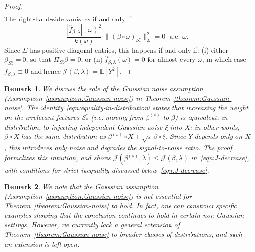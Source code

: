 \documentclass[sn-mathphys-num]{sn-jnl}%
\numberwithin{equation}{section}
\newcommand{\redblock}[1]{{\color{black}#1}}
\theoremstyle{thmstyleone}%
\theoremstyle{thmstyletwo}%
\newtheorem{remark}{Remark}%
\theoremstyle{thmstylethree}%
\begin{document}
\begin{proof}
\begin{equation*}
\begin{split}
\end{split} 
\end{equation*} 
The right-hand-side vanishes if and only if
\begin{equation*}
	\frac{|\widehat {f}_{\beta, \lambda} |(\omega)^2}{k(\omega)} \cdot  \|(\beta \circ \omega)_{S_*^c}\|^2_\Sigma = 0~~~\text{a.e. $\omega$}.
\end{equation*} 
Since $\Sigma $ has positive diagonal entries, this happens if and only if: (i) either $\beta_{S_*^c} = 0$, so that $\Pi_{S_*^c} \beta = 0$; or (ii) 
$\widehat{f}_{\beta, \lambda}(\omega) = 0$ for almost every $\omega$, in which case $f_{\beta, \lambda} \equiv 0$ and hence $\mathcal{J}(\beta, \lambda) = \mathbb{E}[Y^2]$.
\end{proof} 

\redblock{
\vspace{.5em} 
\begin{remark}\label{remark:gaussian-noise-identity} \emph{
We discuss the role of the Gaussian noise assumption (Assumption~\ref{assumption:Gaussian-noise}) in Theorem~\ref{theorem:Gaussian-noise}. 
The identity~\eqref{eqn:equality-in-distribution} states that increasing the weight on the irrelevant features $S_*^c$ (i.e. moving from $\beta^{(s)}$ to $\beta$) is equivalent, in distribution, to injecting \emph{independent} Gaussian noise $\xi$ into $X$; in other words, $\beta \circ X$ has the same distribution as $\beta^{(s)} \circ X + \sqrt{s}\,\beta \circ \xi$.
Since $Y$ depends only on $X$, this introduces only noise and degrades the signal-to-noise ratio. 
The proof formalizes this intuition, and shows $\mathcal{J}(\beta^{(s)}, \lambda) \le \mathcal{J}(\beta, \lambda)$ in~\eqref{eqn:J-decrease}, with conditions for strict inequality discussed below~\eqref{eqn:J-decrease}. }
\end{remark}

\vspace{.5em} 
\begin{remark}\label{remark:gaussian-extension-open}\emph{
We note that the Gaussian assumption (Assumption~\ref{assumption:Gaussian-noise}) is not essential for Theorem~\ref{theorem:Gaussian-noise} to hold. 
In fact, one can construct specific examples showing that the conclusion continues to hold in certain non-Gaussian settings.  However, we currently lack a general extension of Theorem~\ref{theorem:Gaussian-noise} to broader classes of distributions, and such an extension is left open.
}
\end{remark} 
}
\end{document}
